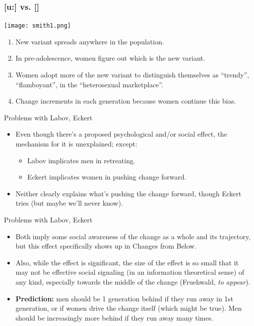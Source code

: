 \documentclass[hyperref={pdfpagelabels=false}]{beamer}
\begin{document}
\begin{frame}
\frametitle{[u:] vs. [] \citep{smithetal2007}}
\begin{center}
\texttt{[image: smith1.png]}
\end{center}
\end{frame}

\begin{frame}{\citet{eckert2011}}
	\begin{enumerate}
	\item New variant spreads anywhere in the population.
	\item In pre-adolescence, women figure out which is the new variant.
	\item Women adopt more of the new variant to distinguish themselves as ``trendy'', ``flamboyant'', in the ``heterosexual marketplace''.
	\item Change increments in each generation because women continue this bias.
	\end{enumerate}
\end{frame}

\begin{frame}{Problems with Labov, Eckert}
	\begin{itemize}
	\item Even though there's a proposed psychological and/or social effect, the mechanism for it is unexplained; except:
		\begin{itemize}
		\item Labov implicates men in retreating.
		\item Eckert implicates women in pushing change forward.
		\end{itemize}
	\item Neither clearly explains what's pushing the change forward, though Eckert tries (but maybe we'll never know).
	\end{itemize}
\end{frame}

\begin{frame}{Problems with Labov, Eckert}
	\begin{itemize}
	\item Both imply some social awareness of the change as a whole and its trajectory, but this effect specifically shows up in Changes from Below.
	\item Also, while the effect is significant, the size of the effect is so small that it may not be effective social signaling (in an information theoretical sense) of any kind, especially towards the middle of the change (Fruehwald, \textsl{to appear}).
	\item \textbf{Prediction:} men should be 1 generation behind if they run away in 1st generation, or if women drive the change itself (which might be true). Men should be increasingly more behind if they run away many times.
	\end{itemize}
\end{frame}
\end{document}
